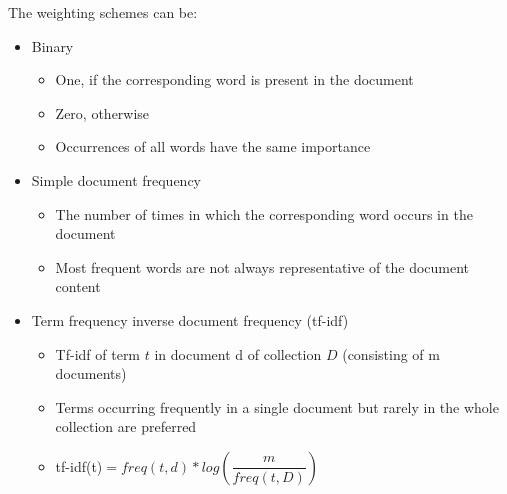 The weighting schemes can be:
\begin{itemize}
    \item  Binary
        \begin{itemize}
            \item One, if the corresponding word is present in the document
            \item Zero, otherwise
            \item Occurrences of all words have the same importance
        \end{itemize}
    \item Simple document frequency
        \begin{itemize}
            \item The number of times in which the corresponding word occurs in the document
            \item Most frequent words are not always representative of the document content
        \end{itemize}
    \item Term frequency inverse document frequency (tf-idf)
        \begin{itemize}
            \item Tf-idf of term $t$ in document d of collection $D$ (consisting of m documents)
            \item Terms occurring frequently in a single document but rarely in the whole collection are preferred
            \item  tf-idf(t)$=   freq(t,d)*log(\dfrac{m}{freq(t,D)} ) $
        \end{itemize}
\end{itemize}


 
